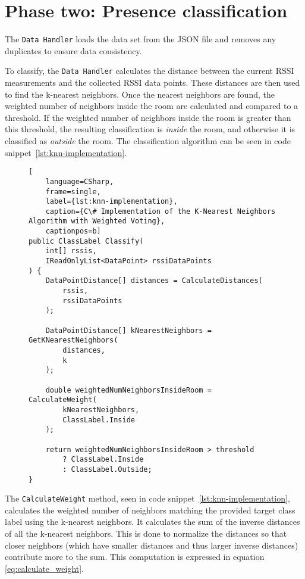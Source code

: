 \section{Phase two: Presence classification}\label{sec:knn_implementation}
The \texttt{Data Handler} loads the data set from the JSON file and removes any duplicates to ensure data consistency.

To classify, the \texttt{Data Handler} calculates the distance between the current RSSI measurements and the collected RSSI data points.
These distances are then used to find the k-nearest neighbors.
Once the nearest neighbors are found, the weighted number of neighbors inside the room are calculated and compared to a threshold.
If the weighted number of neighbors inside the room is greater than this threshold, the resulting classification is \textit{inside} the room, and otherwise it is classified as \textit{outside} the room.
The classification algorithm can be seen in code snippet~\ref{lst:knn-implementation}.

\begin{figure}[H]
\begin{lstlisting}[
	language=CSharp, 
	frame=single, 
	label={lst:knn-implementation},
	caption={C\# Implementation of the K-Nearest Neighbors Algorithm with Weighted Voting}, 
	captionpos=b] 
public ClassLabel Classify(
	int[] rssis, 
	IReadOnlyList<DataPoint> rssiDataPoints
) {
	DataPointDistance[] distances = CalculateDistances(
		rssis, 
		rssiDataPoints
	);

	DataPointDistance[] kNearestNeighbors = GetKNearestNeighbors(
		distances,
		k
	);

	double weightedNumNeighborsInsideRoom = CalculateWeight(
		kNearestNeighbors,
		ClassLabel.Inside
	);

	return weightedNumNeighborsInsideRoom > threshold 
		? ClassLabel.Inside 
		: ClassLabel.Outside;
}
\end{lstlisting}
\end{figure}

The \texttt{CalculateWeight} method, seen in code snippet~\ref{lst:knn-implementation}, calculates the weighted number of neighbors matching the provided target class label using the k-nearest neighbors.
It calculates the sum of the inverse distances of all the k-nearest neighbors. This is done to normalize the distances so that closer neighbors (which have smaller distances and thus larger inverse distances) contribute more to the sum.
This computation is expressed in equation \ref{eq:calculate_weight}.

